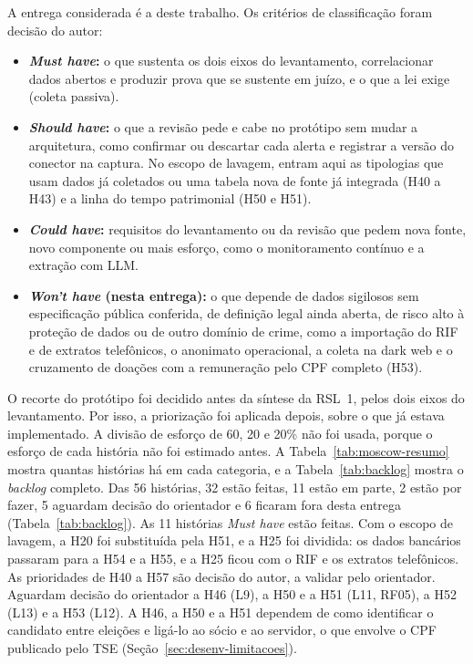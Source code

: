 A entrega considerada é a deste trabalho. Os critérios de classificação
foram decisão do autor:
\begin{itemize}
	\item \textbf{\textit{Must have}:} o que sustenta os dois eixos do
	levantamento, correlacionar dados abertos e produzir prova que se sustente
	em juízo, e o que a lei exige (coleta passiva).
	\item \textbf{\textit{Should have}:} o que a revisão pede e cabe no
	protótipo sem mudar a arquitetura, como confirmar ou descartar cada
	alerta e registrar a versão do conector na captura. No escopo de
	lavagem, entram aqui as tipologias que usam dados já coletados ou uma
	tabela nova de fonte já integrada (H40 a H43) e a linha do tempo
	patrimonial (H50 e H51).
	\item \textbf{\textit{Could have}:} requisitos do levantamento ou da
	revisão que pedem nova fonte, novo componente ou mais esforço, como o
	monitoramento contínuo e a extração com LLM.
	\item \textbf{\textit{Won't have} (nesta entrega):} o que depende de dados
	sigilosos sem especificação pública conferida, de definição legal ainda
	aberta, de risco alto à proteção de dados ou de outro domínio de crime,
	como a importação do RIF e de extratos telefônicos, o anonimato
	operacional, a coleta na dark web e o cruzamento de doações com a
	remuneração pelo CPF completo (H53).
\end{itemize}

O recorte do protótipo foi decidido antes da síntese da RSL~1, pelos dois
eixos do levantamento. Por isso, a priorização foi aplicada depois, sobre o
que já estava implementado. A divisão de esforço de 60, 20 e 20\% não foi
usada, porque o esforço de cada história não foi estimado antes. A
Tabela~\ref{tab:moscow-resumo} mostra quantas histórias há em cada
categoria, e a Tabela~\ref{tab:backlog} mostra o \textit{backlog} completo.
Das 56 histórias, 32 estão feitas, 11 estão em parte, 2 estão por fazer, 5
aguardam decisão do orientador e 6 ficaram fora desta entrega
(Tabela~\ref{tab:backlog}). As 11 histórias \textit{Must have} estão
feitas. Com o escopo de lavagem, a H20 foi substituída pela H51, e a H25 foi
dividida: os dados bancários passaram para a H54 e a H55, e a H25 ficou com o
RIF e os extratos telefônicos. As prioridades de H40 a H57 são decisão do
autor, a validar pelo orientador. Aguardam decisão do orientador a H46
(L9), a H50 e a H51 (L11, RF05), a H52 (L13) e a H53 (L12). A H46, a H50 e a
H51 dependem de como identificar o candidato entre eleições e ligá-lo ao
sócio e ao servidor, o que envolve o CPF publicado pelo TSE
(Seção~\ref{sec:desenv-limitacoes}).

\endgroup
